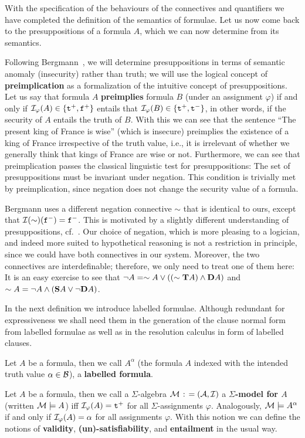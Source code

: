 \documentclass{\filespath jancl}
\def\deq{{\;\colon\kern-.2em=\;}}
\def\phi{\varphi}
\def\cA{{\cal A}}\def\cB{{\cal B}}\def\cC{{\cal C}}
\def\cM{{\cal M}}\def\cN{{\cal N}}\def\cO{{\cal O}}
\let\phi\varphi
\newcommand{\twts}{{{\tt t}^+}}
\newcommand{\twfs}{{{\tt f}^+}}
\newcommand{\twti}{{{\tt t}^-}}
\newcommand{\twfi}{{{\tt f}^-}}
\newcommand{\Tval}{{\cal B}}
\def\tf{{\bf D}}
\def\holds{{\bf T}}
\def\deft{{\bf S}}
\begin{document}
With the specification of the behaviours of the connectives and quantifiers we have
completed the definition of the semantics of formulae. Let us now come back to the
presuppositions of a formula $A$, which we can now determine from its semantics.
\begin{remark}
  Following Bergmann~\cite{Bergmann:patdl81}, we will determine presuppositions in terms
  of semantic anomaly (insecurity) rather than truth; we will use the logical
  concept of {\bf preimplication} as a formalization of the intuitive concept of
  presuppositions. Let us say that formula $A$ {\bf preimplies} formula $B$ (under
  an assignment $\phi$) if and only if $\cI_\phi(A)\in\{\twts,\twfs\}$ entails that
  $\cI_\phi(B)\in\{\twts,\twti\}$, in other words, if the security of $A$ entails
  the truth of $B$. With this we can see that the sentence ``The present king of
  France is wise'' (which is insecure) preimplies the existence of a king of
  France irrespective of the truth value, i.e., it is irrelevant of whether we generally
  think that kings of France are wise or not. Furthermore, we can see that
  preimplication passes the classical linguistic test for presuppositions: The set
  of presuppositions must be invariant under negation. This condition is trivially
  met by preimplication, since negation does not change the security value of a
  formula.
\end{remark}

Bergmann uses a different negation connective $\sim$ that is identical to ours, except that
$\cI(\sim)(\twfi)=\twfi$.  This is motivated by a slightly different understanding
of presuppositions, cf.~\cite{Bergmann:patdl81}. Our choice of negation, which is more
pleasing to a logician, and indeed more suited to hypothetical reasoning is not a
restriction in principle, since we could have both connectives in our system.  Moreover, the
two connectives are interdefinable; therefore, we only need to treat one of them
here: It is an easy exercise to see that $\neg A=\sim A\lor((\sim\holds
A)\land \tf A)$ and $\sim A=\neg A\land(\deft A\lor \neg\tf A)$.

In the next definition we introduce labelled formulae. Although
redundant for expressiveness we shall need them in the generation of the
clause normal form from labelled formulae as well as in the resolution
calculus in form of labelled clauses.

\begin{definition}\label{Def:model}
  Let $A$ be a formula, then we call $A^\alpha$ (the formula $A$ indexed with
  the intended truth value $\alpha\in\Tval$), a {\bf labelled formula}. 
  
  Let $A$ be a formula, then we call a $\Sigma$-algebra $\cM\deq(\cA,\cI)$ a
  {\bf $\Sigma$-model for $A$} (written $\cM\models A$) iff
  $\cI_\phi(A)=\twts$ for all $\Sigma$-assignments $\phi$. Analogously,
  $\cM\models A^{\alpha}$ if and only if $\cI_{\phi}(A)=\alpha$ for all assignments
  $\phi$. With this notion we can define the notions of {\bf validity}, {\bf
    (un)-satisfiability}, and {\bf entailment} in the usual way.
\end{definition}
\end{document}
